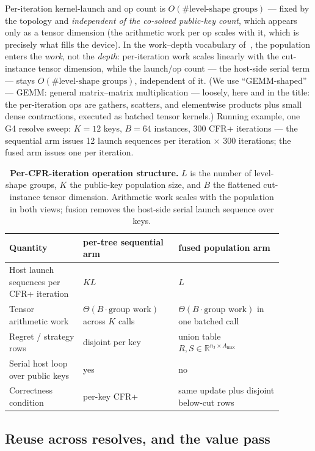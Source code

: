 \documentclass[11pt]{article}
\begin{document}
Per-iteration kernel-launch and op count is $O(\#\text{level-shape groups})$ --- fixed
by the topology and \emph{independent of the co-solved public-key count}, which appears only as a
tensor dimension (the arithmetic work per op scales with it, which is precisely what
fills the device). In the work--depth vocabulary of~\citep{KimSandholm2026}, the
population enters the \emph{work}, not the \emph{depth}: per-iteration work scales
linearly with the cut-instance tensor dimension, while the launch/op count --- the host-side serial
term --- stays $O(\#\text{level-shape groups})$, independent of it. (We use
``GEMM-shaped'' --- GEMM: general matrix--matrix multiplication --- loosely, here and in
the title: the per-iteration ops are gathers, scatters, and elementwise products plus
small dense contractions, executed as batched tensor kernels.) Running example, one G4 resolve
sweep: $K = 12$ keys, $B = 64$ instances, 300 CFR+ iterations --- the sequential arm
issues 12 launch sequences per iteration $\times$ 300 iterations; the fused arm issues
one per iteration.

\begin{table}[t]
\centering
\caption{\textbf{Per-CFR-iteration operation structure.} $L$ is the number of
level-shape groups, $K$ the public-key population size, and $B$ the flattened
cut-instance tensor dimension. Arithmetic work scales with the population in both views;
fusion removes the host-side serial launch sequence over keys.}
\label{tab:opcount}
\begin{tabular}{p{0.24\linewidth}p{0.31\linewidth}p{0.34\linewidth}}
\toprule
Quantity & per-tree sequential arm & fused population arm \\
\midrule
Host launch sequences per CFR+ iteration & $K L$ & $L$ \\
Tensor arithmetic work & $\Theta(B \cdot \text{group work})$ across $K$ calls &
$\Theta(B \cdot \text{group work})$ in one batched call \\
Regret / strategy rows & disjoint per key & union table $R,S\in\mathbb{R}^{n_I\times A_{\max}}$ \\
Serial host loop over public keys & yes & no \\
Correctness condition & per-key CFR+ & same update plus disjoint below-cut rows \\
\bottomrule
\end{tabular}
\end{table}

\subsection{Reuse across resolves, and the value pass}
\end{document}

